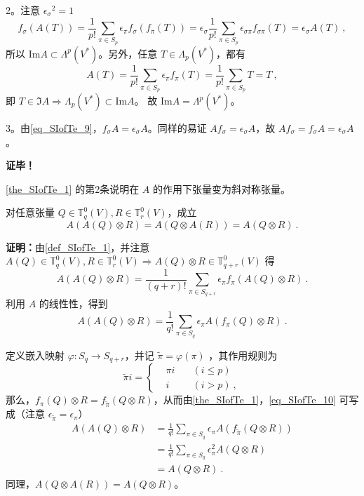 2。注意 ${\epsilon_\sigma}^2=1$
\begin{equation}\label{eq_SIofTe_9}
f_\sigma(A(T))=\frac{1}{p!}\sum_{\pi\in S_p}\epsilon_\pi f_\sigma(f_\pi(T))=\epsilon_\sigma\frac{1}{p!}\sum_{\pi\in S_p}\epsilon_{\sigma\pi} f_{\sigma\pi}(T)=\epsilon_\sigma A(T)~,
\end{equation}
 所以 $\mathrm{Im} A\subset\Lambda^p(V^*)$。另外，任意 $T\in\Lambda_p(V^*)$，都有
 \begin{equation}\label{eq_SIofTe_11}
 A(T)=\frac{1}{p!}\sum_{\pi\in S_p}\epsilon_\pi f_\pi(T)=\frac{1}{p!}\sum_{\pi\in S_p}T=T~,
 \end{equation}
 即 $T\in \Im A\Rightarrow\Lambda_p(V^*)\subset\mathrm{Im} A$。
 故 $\mathrm{Im} A=\Lambda^p(V^*)$。

3。由\autoref{eq_SIofTe_9}，$f_\sigma A=\epsilon_\sigma A$。同样的易证 $Af_\sigma=\epsilon_\sigma A$，故 $Af_\sigma=f_\sigma A=\epsilon_\sigma A$。

\textbf{证毕！}

\autoref{the_SIofTe_1} 的第2条说明在 $A$ 的作用下张量变为斜对称张量。

\begin{theorem}{}\label{the_SIofTe_2}
对任意张量 $Q\in\mathbb T_q^0(V),R\in\mathbb T_r^0(V)$，成立
\begin{equation}
A(A(Q)\otimes R)=A(Q\otimes A(R))=A(Q\otimes R)~.
\end{equation}
\end{theorem}
\textbf{证明：}由\autoref{def_SIofTe_1}，并注意 $A(Q)\in\mathbb T_q^0(V),R\in\mathbb T_r^0(V)\Rightarrow A(Q)\otimes R\in\mathbb T_{q+r}^0(V)$ 得
\begin{equation}
A(A(Q)\otimes R)=\frac{1}{(q+r)!}\sum_{\pi\in S_{q+r}}\epsilon_\pi f_{\pi}(A(Q)\otimes R)~.
\end{equation}
 利用 $A$ 的线性性，得到
 \begin{equation}\label{eq_SIofTe_10}
 A(A(Q)\otimes R)=\frac{1}{q!}\sum_{\pi\in S_q}\epsilon_\pi A(f_{\pi}(Q)\otimes R)~.
 \end{equation}
 
 定义嵌入映射 $\varphi:S_q\rightarrow S_{q+r}$，并记 $\tilde \pi=\varphi(\pi)$ ，其作用规则为
 \begin{equation}
 \tilde\pi i=\left\{\begin{aligned}
 &\pi i\quad &(i\leq p)\\
 &i\quad &(i>p)~,
 \end{aligned}\right.
 \end{equation}
 那么，$f_\pi(Q)\otimes R=f_{\tilde\pi}(Q\otimes R)$，从而由\autoref{the_SIofTe_1}，\autoref{eq_SIofTe_10} 可写成（注意 $\epsilon_{\tilde\pi}=\epsilon_\pi$）
 \begin{equation}
 \begin{aligned}
 A(A(Q)\otimes R)&=\frac{1}{q!}\sum_{\pi\in S_q}\epsilon_\pi A(f_{\tilde\pi}(Q\otimes R))\\
&=\frac{1}{q!}\sum_{\pi\in S_q}\epsilon_\pi^2 A(Q\otimes R)\\
&=A(Q\otimes R)~.
 \end{aligned}
 \end{equation}
 同理，$A(Q\otimes A(R))=A(Q\otimes R)$。

